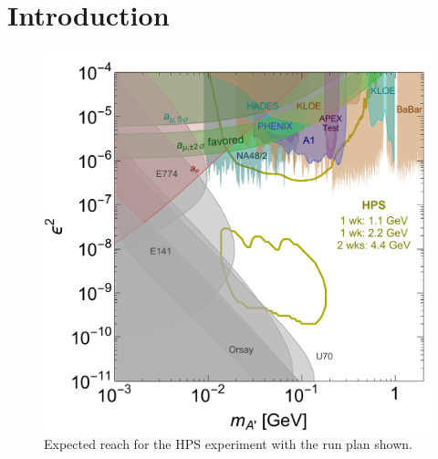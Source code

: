 \chapter{Introduction}
\begin{figure}[ht]
    \includegraphics[width=\textwidth]{intro/figs/A-visible-HPS-official-6-2015}
    \caption{Expected reach for the HPS experiment with the run plan shown.}
    \label{fig:reach}
\end{figure}

